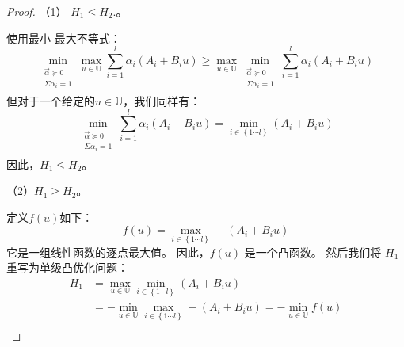 \begin{proof}
    
（1） $H_1 \le H_2$.。

使用最小-最大不等式：
\begin{equation}
\min_{\begin{array}{c}
	\overrightarrow{\alpha }\succeq 0\\
	\Sigma \alpha _i=1\\
\end{array}}\max_{u\in \mathbb{U}}\sum_{i=1}^l{\alpha _i\left( A_i+B_iu \right)}\ge \max_{u\in \mathbb{U}}\min_{\begin{array}{c}
	\overrightarrow{\alpha }\succeq 0\\
	\Sigma \alpha _i=1\\
\end{array}}\sum_{i=1}^l{\alpha _i\left( A_i+B_iu \right)}
\end{equation}
但对于一个给定的$u \in \mathbb{U}$，我们同样有：
\begin{equation}
\min_{\begin{array}{c}
	\overrightarrow{\alpha }\succeq 0\\
	\Sigma \alpha _i=1\\
\end{array}}\sum_{i=1}^l{\alpha _i\left( A_i+B_iu \right)}=\min_{i\in \left\{ 1\cdots l \right\}}\left( A_i+B_iu \right) 
\end{equation}
因此，$H_1 \le H_2$。

（2）$H_1 \ge H_2$。

定义$f(u)$如下：
\begin{equation}
f\left( u \right) =\max_{i\in \left\{ 1\cdots l \right\}}-\left( A_i+B_iu \right) 
\end{equation}
它是一组线性函数的逐点最大值。 因此，$f(u)$ 是一个凸函数。 然后我们将 $H_1$ 重写为单级凸优化问题：
\begin{equation}
\begin{aligned}
	H_1&=\max_{u\in \mathbb{U}}\min_{i\in \left\{ 1\cdots l \right\}}\left( A_i+B_iu \right)\\
	&=-\min_{u\in \mathbb{U}}\max_{i\in \left\{ 1\cdots l \right\}}-\left( A_i+B_iu \right) =-\min_{u\in \mathbb{U}}f\left( u \right)\\
\end{aligned}
\end{equation}


\end{proof}

